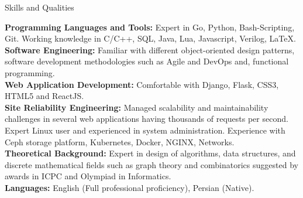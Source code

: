 \documentclass{resume} %
\begin{document}
\begin{rSection}{Skills and Qualities}

	{\bf Programming Languages and Tools:}
	Expert in Go, Python, Bash-Scripting, Git. Working knowledge in C/C++, SQL, Java, 
    Lua, Javascript, Verilog, \LaTeX. \smallskip
	\\
	{\bf Software Engineering:}
	Familiar with different object-oriented design patterns, software development 
    methodologies such as Agile and DevOps and, functional programming.\smallskip
	\\
	{\bf Web Application Development:}
	Comfortable with Django, Flask, CSS3, HTML5 and ReactJS.\smallskip
	\\
	{\bf Site Reliability Engineering:}
	Managed scalability and maintainability challenges in several web applications having 
    thousands of requests per second.  Expert Linux user and experienced in system administration.
	Experience with Ceph storage platform, Kubernetes, Docker, NGINX, Networks.\smallskip
	\\
	{\bf Theoretical Background:}
	Expert in design of algorithms, data structures, and discrete mathematical fields such 
    as graph theory and combinatorics suggested by awards in ICPC and Olympiad in 
    Informatics.\smallskip
	\\
	{\bf Languages:}
	English (Full professional proficiency), Persian (Native).\smallskip

\end{rSection}
	
\end{document}
